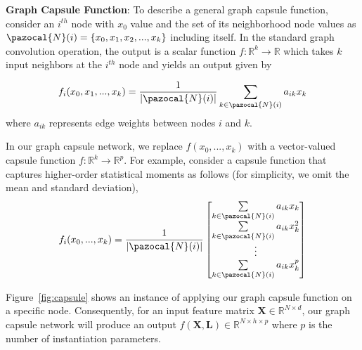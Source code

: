 \documentclass{article}
\newcommand{\Na}{\pazocal{N}}
\begin{document}
\noindent \textbf{Graph Capsule Function}: To describe a general graph capsule function, consider an $i^{th}$ node  with $x_0$ value and the set of its neighborhood node values as $\Na(i)=\{x_0, x_1, x_2,...,x_k\}$ including itself. In the standard graph convolution operation, the output is a scalar function $f:\mathbb{R}^{k}\rightarrow \mathbb{R}$ which takes $k$  input neighbors at the $i^{th}$ node and yields an output given by

\begin{equation}\label{eq:gcnn_op}
\begin{split}
f_i(x_0, x_1,...,x_k) = \frac{1}{|\Na(i)|} \sum_{k \in \Na(i)} a_{ik} x_k \\
\end{split}
\end{equation}
where $a_{ik}$ represents   edge weights between nodes $i$ and $k$. 

In our graph capsule network, we replace $f(x_0,..., x_k)$ with a vector-valued capsule function $f:\mathbb{R}^{k}\rightarrow \mathbb{R}^{p}$. For example, consider a  capsule function that captures higher-order statistical moments as follows (for simplicity, we omit the mean and standard deviation),
\begin{equation}\label{eq:capsule}
\begin{split}
f_i(x_0,...,x_k) &  = \frac{1}{|\Na(i)|} \begin{bmatrix}
	\sum\limits_{k \in \Na(i)} a_{ik} x_k  \\
	\sum\limits_{k \in \Na(i)} a_{ik} x^2_k   \\
	\vdots \\
		\sum\limits_{k \in \Na(i)} a_{ik} x^p_k   \\
	\end{bmatrix}\\
\end{split}
\end{equation}

Figure~\ref{fig:capsule} shows an instance of applying  our graph capsule function   on a specific node. Consequently,  for an input feature matrix $\mathbf{X} \in \mathbb{R}^{N \times d} $, our graph capsule network will produce an output  $f(\mathbf{X}, \mathbf{L}) \in \mathbb{R}^{N \times h \times p} $ where $p$ is the number of instantiation parameters.
\end{document}
